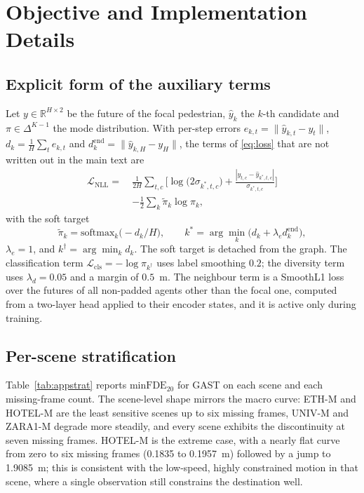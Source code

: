 \appendix
\section{Objective and Implementation Details}
\label{app:impl}

\subsection{Explicit form of the auxiliary terms}
\label{app:loss}

Let $y\in\mathbb{R}^{H\times2}$ be the future of the focal pedestrian, $\hat{y}_{k}$ the $k$-th candidate and $\pi\in\Delta^{K-1}$ the mode distribution. With per-step errors $e_{k,t}=\|\hat{y}_{k,t}-y_{t}\|$, $d_{k}=\frac{1}{H}\sum_{t}e_{k,t}$ and $d^{\mathrm{end}}_{k}=\|\hat{y}_{k,H}-y_{H}\|$, the terms of \eqref{eq:loss} that are not written out in the main text are
\begin{equation}
\begin{aligned}
\mathcal{L}_{\mathrm{NLL}}=\ &\frac{1}{2H}\sum_{t,c}\Big[\log\big(2\sigma_{k^{\ast},t,c}\big)+\frac{|y_{t,c}-\hat{y}_{k^{\ast},t,c}|}{\sigma_{k^{\ast},t,c}}\Big]\\
&-\frac{1}{2}\sum_{k}\tilde{\pi}_{k}\log\pi_{k},
\end{aligned}
\label{eq:nll}
\end{equation}
with the soft target
\begin{equation}
\tilde{\pi}_{k}=\mathrm{softmax}_{k}\big(-d_{k}/H\big),\qquad
k^{\ast}=\arg\min_{k}\big(d_{k}+\lambda_{e}d^{\mathrm{end}}_{k}\big),
\label{eq:softtarget}
\end{equation}
$\lambda_{e}=1$, and $k^{\dagger}=\arg\min_{k}d_{k}$. The soft target is detached from the graph. The classification term $\mathcal{L}_{\mathrm{cls}}=-\log\pi_{k^{\dagger}}$ uses label smoothing $0.2$; the diversity term uses $\lambda_{d}=0.05$ and a margin of $0.5$~m. The neighbour term is a SmoothL1 loss over the futures of all non-padded agents other than the focal one, computed from a two-layer head applied to their encoder states, and it is active only during training.

\subsection{Per-scene stratification}
\label{app:strat}

Table~\ref{tab:appstrat} reports $\mathrm{minFDE}_{20}$ for GAST on each scene and each missing-frame count. The scene-level shape mirrors the macro curve: ETH-M and HOTEL-M are the least sensitive scenes up to six missing frames, UNIV-M and ZARA1-M degrade more steadily, and every scene exhibits the discontinuity at seven missing frames. HOTEL-M is the extreme case, with a nearly flat curve from zero to six missing frames (0.1835 to 0.1957~m) followed by a jump to 1.9085~m; this is consistent with the low-speed, highly constrained motion in that scene, where a single observation still constrains the destination well.

